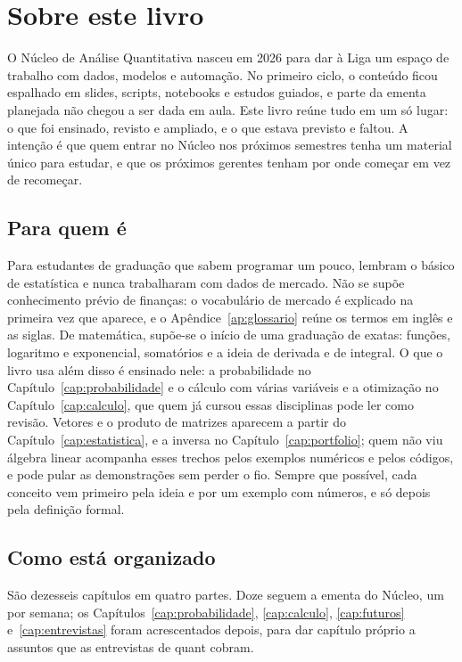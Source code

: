 \chapter*{Sobre este livro}

O Núcleo de Análise Quantitativa nasceu em 2026 para dar à Liga um espaço de trabalho com dados, modelos e automação. No primeiro ciclo, o conteúdo ficou espalhado em slides, scripts, notebooks e estudos guiados, e parte da ementa planejada não chegou a ser dada em aula. Este livro reúne tudo em um só lugar: o que foi ensinado, revisto e ampliado, e o que estava previsto e faltou. A intenção é que quem entrar no Núcleo nos próximos semestres tenha um material único para estudar, e que os próximos gerentes tenham por onde começar em vez de recomeçar.

\section*{Para quem é}

Para estudantes de graduação que sabem programar um pouco, lembram o básico de estatística e nunca trabalharam com dados de mercado. Não se supõe conhecimento prévio de finanças: o vocabulário de mercado é explicado na primeira vez que aparece, e o Apêndice~\ref{ap:glossario} reúne os termos em inglês e as siglas. De matemática, supõe-se o início de uma graduação de exatas: funções, logaritmo e exponencial, somatórios e a ideia de derivada e de integral. O que o livro usa além disso é ensinado nele: a probabilidade no Capítulo~\ref{cap:probabilidade} e o cálculo com várias variáveis e a otimização no Capítulo~\ref{cap:calculo}, que quem já cursou essas disciplinas pode ler como revisão. Vetores e o produto de matrizes aparecem a partir do Capítulo~\ref{cap:estatistica}, e a inversa no Capítulo~\ref{cap:portfolio}; quem não viu álgebra linear acompanha esses trechos pelos exemplos numéricos e pelos códigos, e pode pular as demonstrações sem perder o fio. Sempre que possível, cada conceito vem primeiro pela ideia e por um exemplo com números, e só depois pela definição formal.

\section*{Como está organizado}

São dezesseis capítulos em quatro partes. Doze seguem a ementa do Núcleo, um por semana; os Capítulos~\ref{cap:probabilidade}, \ref{cap:calculo}, \ref{cap:futuros} e~\ref{cap:entrevistas} foram acrescentados depois, para dar capítulo próprio a assuntos que as entrevistas de quant cobram.

